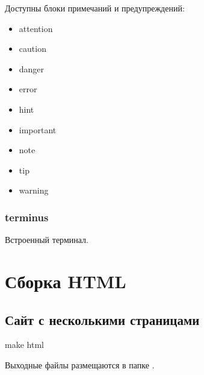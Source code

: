 \documentclass[letterpaper,12pt,russian]{sphinxmanual}
\begin{document}
Доступны блоки примечаний и предупреждений:
\begin{itemize}
\item {} 
attention

\item {} 
caution

\item {} 
danger

\item {} 
error

\item {} 
hint

\item {} 
important

\item {} 
note

\item {} 
tip

\item {} 
warning

\end{itemize}



\subsubsection{terminus}
\label{\detokenize{editor:terminus}}
Встроенный терминал.



\section{Сборка HTML}
\label{\detokenize{html:html}}\label{\detokenize{html::doc}}

\subsection{Сайт с несколькими страницами}
\label{\detokenize{html:id1}}
\begin{sphinxVerbatim}[commandchars=\\\{\}]
make html
\end{sphinxVerbatim}

Выходные файлы размещаются в папке .
\end{document}
